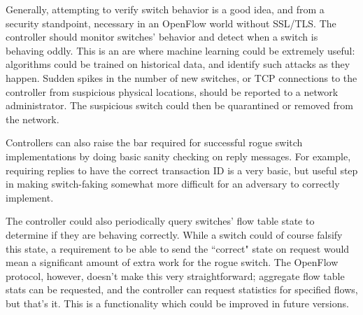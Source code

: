 Generally, attempting to verify switch behavior is a good idea, and from a security standpoint, necessary in an OpenFlow world without SSL/TLS. 
The controller should monitor switches' behavior and detect when a switch is behaving oddly. This is an are where machine learning could be extremely useful: algorithms could be trained on historical data, and identify such attacks as they happen. Sudden spikes in the number of new switches, or TCP connections to the controller from suspicious physical locations, should be reported to a network administrator. The suspicious switch could then be quarantined or removed from the network.

Controllers can also raise the bar required for successful rogue switch implementations by doing basic sanity checking on reply messages. For example, requiring replies to have the correct transaction ID is a very basic, but useful step in making switch-faking somewhat more difficult for an adversary to correctly implement.

The controller could also periodically query switches' flow table state to determine if they are behaving correctly. While a switch could of course falsify this state, a requirement to be able to send the ``correct" state on request would mean a significant amount of extra work for the rogue switch. The OpenFlow protocol, however, doesn't make this very straightforward; aggregate flow table stats can be requested, and the controller can request statistics for specified flows, but that's it. This is a functionality which could be improved in future versions.

